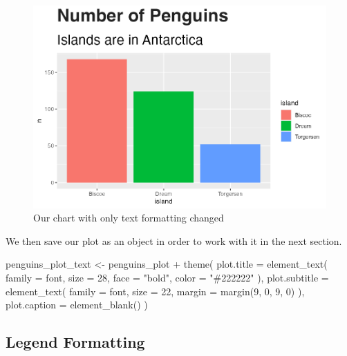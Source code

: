 \documentclass[
]{book}
\newenvironment{Shaded}{\begin{snugshade}}{\end{snugshade}}
\newcommand{\AttributeTok}[1]{\textcolor[rgb]{0.77,0.63,0.00}{#1}}
\newcommand{\DecValTok}[1]{\textcolor[rgb]{0.00,0.00,0.81}{#1}}
\newcommand{\FunctionTok}[1]{\textcolor[rgb]{0.00,0.00,0.00}{#1}}
\newcommand{\NormalTok}[1]{#1}
\newcommand{\OtherTok}[1]{\textcolor[rgb]{0.56,0.35,0.01}{#1}}
\newcommand{\SpecialCharTok}[1]{\textcolor[rgb]{0.00,0.00,0.00}{#1}}
\newcommand{\StringTok}[1]{\textcolor[rgb]{0.31,0.60,0.02}{#1}}
\begin{document}
\begin{figure}
\includegraphics[width=1\linewidth]{custom-theme_files/figure-latex/penguins-plot-text-formatting-plot-1} \caption{Our chart with only text formatting changed}\label{fig:penguins-plot-text-formatting-plot}
\end{figure}

We then save our plot as an object in order to work with it in the next section.

\begin{Shaded}
\begin{Highlighting}[]
\NormalTok{penguins\_plot\_text }\OtherTok{\textless{}{-}}\NormalTok{ penguins\_plot }\SpecialCharTok{+}
  \FunctionTok{theme}\NormalTok{(}
    \AttributeTok{plot.title =} \FunctionTok{element\_text}\NormalTok{(}
      \AttributeTok{family =}\NormalTok{ font,}
      \AttributeTok{size =} \DecValTok{28}\NormalTok{,}
      \AttributeTok{face =} \StringTok{"bold"}\NormalTok{,}
      \AttributeTok{color =} \StringTok{"\#222222"}
\NormalTok{    ),}
    \AttributeTok{plot.subtitle =} \FunctionTok{element\_text}\NormalTok{(}
      \AttributeTok{family =}\NormalTok{ font,}
      \AttributeTok{size =} \DecValTok{22}\NormalTok{,}
      \AttributeTok{margin =} \FunctionTok{margin}\NormalTok{(}\DecValTok{9}\NormalTok{, }\DecValTok{0}\NormalTok{, }\DecValTok{9}\NormalTok{, }\DecValTok{0}\NormalTok{)}
\NormalTok{    ),}
    \AttributeTok{plot.caption =} \FunctionTok{element\_blank}\NormalTok{()}
\NormalTok{  )}
\end{Highlighting}
\end{Shaded}

\hypertarget{legend-formatting}{%
\subsection*{Legend Formatting}\label{legend-formatting}}
\end{document}
